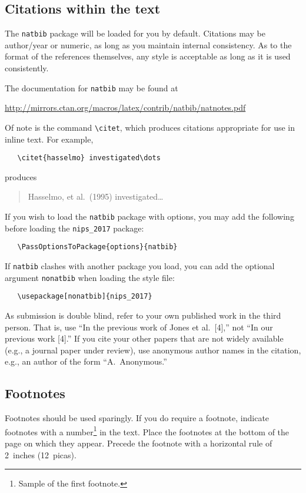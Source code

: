 \documentclass{article}
\begin{document}
\subsection{Citations within the text}

The \verb+natbib+ package will be loaded for you by default.
Citations may be author/year or numeric, as long as you maintain
internal consistency.  As to the format of the references themselves,
any style is acceptable as long as it is used consistently.

The documentation for \verb+natbib+ may be found at
\begin{center}
  \url{http://mirrors.ctan.org/macros/latex/contrib/natbib/natnotes.pdf}
\end{center}
Of note is the command \verb+\citet+, which produces citations
appropriate for use in inline text.  For example,
\begin{verbatim}
   \citet{hasselmo} investigated\dots
\end{verbatim}
produces
\begin{quote}
  Hasselmo, et al.\ (1995) investigated\dots
\end{quote}

If you wish to load the \verb+natbib+ package with options, you may
add the following before loading the \verb+nips_2017+ package:
\begin{verbatim}
   \PassOptionsToPackage{options}{natbib}
\end{verbatim}

If \verb+natbib+ clashes with another package you load, you can add
the optional argument \verb+nonatbib+ when loading the style file:
\begin{verbatim}
   \usepackage[nonatbib]{nips_2017}
\end{verbatim}

As submission is double blind, refer to your own published work in the
third person. That is, use ``In the previous work of Jones et
al.\ [4],'' not ``In our previous work [4].'' If you cite your other
papers that are not widely available (e.g., a journal paper under
review), use anonymous author names in the citation, e.g., an author
of the form ``A.\ Anonymous.''

\subsection{Footnotes}

Footnotes should be used sparingly.  If you do require a footnote,
indicate footnotes with a number\footnote{Sample of the first
  footnote.} in the text. Place the footnotes at the bottom of the
page on which they appear.  Precede the footnote with a horizontal
rule of 2~inches (12~picas).
\end{document}
